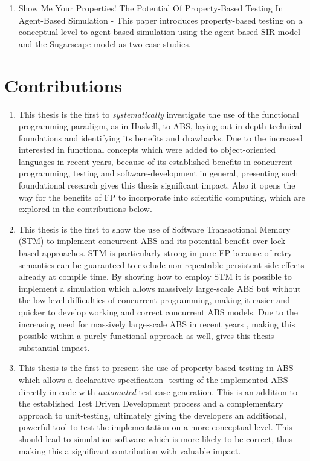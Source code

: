 \begin{enumerate}
	\item Show Me Your Properties! The Potential Of Property-Based Testing In Agent-Based Simulation - This paper introduces property-based testing on a conceptual level to agent-based simulation using the agent-based SIR model and the Sugarscape model as two case-studies. 
\end{enumerate}

\newpage

\section{Contributions}
\begin{enumerate}
	\item This thesis is the first to \textit{systematically} investigate the use of the functional programming paradigm, as in Haskell, to ABS, laying out in-depth technical foundations and identifying its benefits and drawbacks. Due to the increased interested in functional concepts which were added to object-oriented languages in recent years, because of its established benefits in concurrent programming, testing and software-development in general, presenting such foundational research gives this thesis significant impact. Also it opens the way for the benefits of FP to incorporate into scientific computing, which are explored in the contributions below.
	
	\item This thesis is the first to show the use of Software Transactional Memory (STM) to implement concurrent ABS and its potential benefit over lock-based approaches. STM is particularly strong in pure FP because of retry-semantics can be guaranteed to exclude non-repeatable persistent side-effects already at compile time. By showing how to employ STM it is possible to implement a simulation which allows massively large-scale ABS but without the low level difficulties of concurrent programming, making it easier and quicker to develop working and correct concurrent ABS models. Due to the increasing need for massively large-scale ABS in recent years \cite{lysenko_framework_2008}, making this possible within a purely functional approach as well, gives this thesis substantial impact.
	
	\item This thesis is the first to present the use of property-based testing in ABS which allows a declarative specification- testing of the implemented ABS directly in code with \textit{automated} test-case generation. This is an addition to the established Test Driven Development process and a complementary approach to unit-testing, ultimately giving the developers an additional, powerful tool to test the implementation on a more conceptual level. This should lead to simulation software which is more likely to be correct, thus making this a significant contribution with valuable impact.


\end{enumerate}
